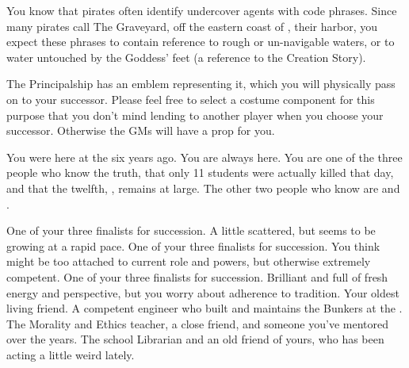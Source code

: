\documentclass[char]{GL2020}
\begin{document}
\begin{itemz}[Notes]
    \item You know that pirates often identify undercover agents with code phrases. Since many pirates call The Graveyard, off the eastern coast of \pEarth{}, their harbor, you expect these phrases to contain reference to rough or un-navigable waters, or to water untouched by the Goddess' feet (a reference to the \pShippie{} Creation Story).
    \item The Principalship has an emblem representing it, which you will physically pass on to your successor. Please feel free to select a costume component for this purpose that you don't mind lending to another player when you choose your successor. Otherwise the GMs will have a prop for you.
    \item You were here at the \pSchool{} six years ago. You are always here. You are one of the three people who know the truth, that only 11 students were actually killed that day, and that the twelfth, \cKidScientist{\full}, remains at large. The other two people who know are \cDiplomat{\full} and \cMusic{\full}.

\end{itemz}
\begin{contacts}
    \contact{\cMusic{}} One of your three finalists for succession. A little scattered, but seems to be growing at a rapid pace.
    \contact{\cBeetle{}} One of your three finalists for succession. You think \cBeetle{\they} might be too attached to \cBeetle{\their} current role and powers, but \cBeetle{\they} \cBeetle{\are} otherwise extremely competent.
    \contact{\cChupSecond{}} One of your three finalists for succession. Brilliant and full of fresh energy and perspective, but you worry about \cChupSecond{\their} adherence to tradition. 
    \contact{\cBunker{}} Your oldest living friend. A competent engineer who built and maintains the Bunkers at the \pSc{}.
    \contact{\cEthics{}} The Morality and Ethics teacher, a close friend, and someone you've mentored over the years.
    \contact{\cLibrarian{}} The school Librarian and an old friend of yours, who has been acting a little weird lately. 
\end{contacts}
\end{document}
